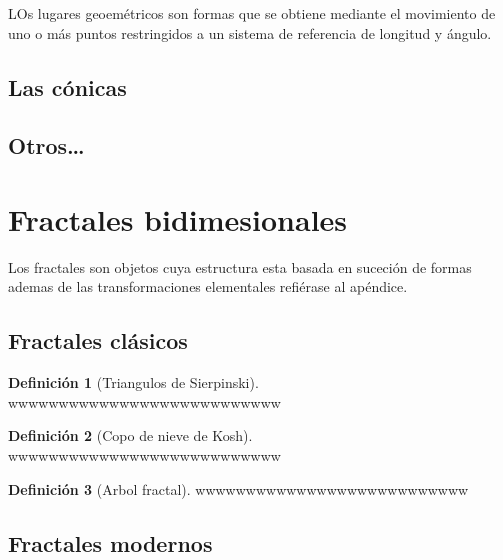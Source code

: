 \documentclass[
  16pt,
]{krantz}
\theoremstyle{definition}
\newtheorem{definition}{Definición}[chapter]
\theoremstyle{definition}
\theoremstyle{definition}
\theoremstyle{definition}
\theoremstyle{remark}
\begin{document}
LOs lugares geoemétricos son formas que se obtiene mediante el movimiento de uno o más puntos restringidos a un sistema de referencia de longitud y ángulo.

\hypertarget{las-cuxf3nicas}{%
\subsection{Las cónicas}\label{las-cuxf3nicas}}

\hypertarget{otros}{%
\subsection{Otros\ldots{}}\label{otros}}

\hypertarget{fractales-bidimesionales}{%
\section{Fractales bidimesionales}\label{fractales-bidimesionales}}

Los fractales son objetos cuya estructura esta basada en suceción de formas ademas de las transformaciones elementales refiérase al apéndice.

\hypertarget{fractales-cluxe1sicos}{%
\subsection{Fractales clásicos}\label{fractales-cluxe1sicos}}

\begin{definition}[Triangulos de Sierpinski]
\protect\hypertarget{def:sierpinski}{}{\label{def:sierpinski} {} }wwwwwwwwwwwwwwwwwwwwwwwwwww
\end{definition}

\begin{definition}[Copo de nieve de Kosh]
\protect\hypertarget{def:kosh}{}{\label{def:kosh} {} }wwwwwwwwwwwwwwwwwwwwwwwwwww
\end{definition}

\begin{definition}[Arbol fractal]
\protect\hypertarget{def:arbol}{}{\label{def:arbol} {} }wwwwwwwwwwwwwwwwwwwwwwwwwww
\end{definition}

\hypertarget{fractales-modernos}{%
\subsection{Fractales modernos}\label{fractales-modernos}}
\end{document}

